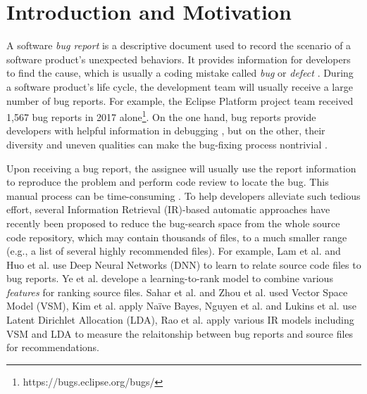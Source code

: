 \section{Introduction and Motivation}
\label{sec:introduction}
A software \textit{bug report} is a descriptive document used to record the scenario of a software product's unexpected behaviors. It provides information for developers to find the cause, which is usually a coding mistake called \textit{bug} or \textit{defect} \cite{Bruegge:2009:OSE:1795808}. During a software product's life cycle, the development team will usually receive a large number of bug reports. For example, the Eclipse Platform project team received 1,567 bug reports in 2017 alone\footnote{https://bugs.eclipse.org/bugs/}. On the one hand, bug reports provide developers with helpful information in debugging \cite{Buse:2012:INS:2337223.2337343}, but on the other, their diversity and uneven qualities can make the bug-fixing process nontrivial \cite{Breu:2010:INB:1718918.1718973}.

Upon receiving a bug report, the assignee will usually use the report information to reproduce the problem \cite{LaToza:2010:HQC:1937117.1937125} and perform code review \cite{Bacchelli:2013:EOC:2486788.2486882} to locate the bug. This manual process can be time-consuming \cite{Murphy-Hill:2013:DBF:2486788.2486833}. To help developers alleviate such tedious effort, several Information Retrieval (IR)-based automatic approaches have recently been proposed to reduce the bug-search space from the whole source code repository, which may contain thousands of files, to a much smaller range (e.g., a list of several highly recommended files). For example, Lam et al. \cite{7372035} and Huo et al. \cite{Huo:2017:EUF:3172077.3172153, Huo:2016:LUF:3060832.3060845} use Deep Neural Networks (DNN) to learn to relate source code files to bug reports. Ye et al. \cite{Ye:ICSE16, Ye:FSE14} develope a learning-to-rank model to combine various \textit{features} for ranking source files. Sahar et al. \cite{Saha:2013:ASE:6693093} and Zhou et al. \cite{Zhou:2012:BFM:2337223.2337226} used Vector Space Model (VSM), Kim et al. \cite{Kim:2013:WFT:2554428.2554437} apply Na\"{i}ve Bayes, Nguyen et al. \cite{Nguyen:2011:TAN:2190078.2190181} and Lukins et al. \cite{Lukins:2010:BLU:1824820.1824850} use Latent Dirichlet Allocation (LDA), Rao et al. \cite{Rao:2011:RSL:1985441.1985451} apply various IR models including VSM and LDA to measure the relaitonship between bug reports and source files for recommendations.

